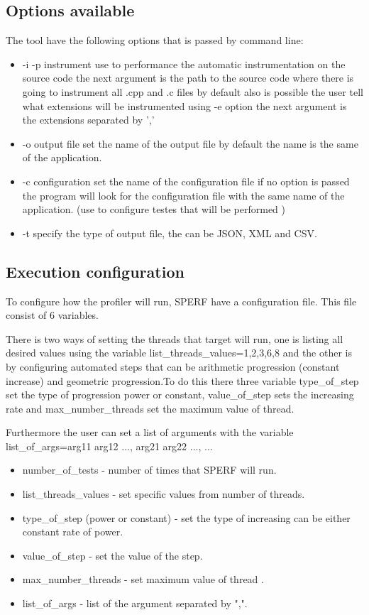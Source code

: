 \documentclass[sigconf]{acmart}
\begin{document}
\subsection{Options available}

The tool have the following options that is passed by command line:
\begin{itemize}
\item -i -p instrument use to performance the automatic instrumentation on the source code the next argument is the path to the source code where there is going to instrument all .cpp and .c files by default also is possible the user tell what extensions will be instrumented using -e option the next argument is the extensions separated by ','
\item -o output file set the name of the output file by default the name is the same of the application.
\item -c configuration set the name of the configuration file if no option is passed the program will look for the configuration file with the same name of the application. (use to configure testes that will be performed )
\item -t specify the type of output file, the can be JSON, XML and CSV.
\end{itemize}

\subsection{Execution configuration}
To configure how the profiler will run, SPERF have a configuration file. This file consist of 6 variables.

There is two ways of setting the threads that target will run, one is listing all desired values using the variable list\_threads\_values={1,2,3,6,8} and the other is by configuring automated steps that can be arithmetic progression (constant increase) and geometric progression.To do this there three variable type\_of\_step set the type of progression power or constant, value\_of\_step sets the increasing rate and max\_number\_threads set the maximum value of thread.

Furthermore the user can set a list of arguments with the variable list\_of\_args={arg11 arg12 ..., arg21 arg22 ..., ...}

\begin{itemize}
\item number\_of\_tests - number of times that SPERF will run.
\item list\_threads\_values - set specific values from number of threads.
\item type\_of\_step (power or constant) - set the type of increasing can be either constant rate of power.
\item value\_of\_step - set the value of the step.
\item max\_number\_threads - set maximum value of thread .
\item list\_of\_args - list of the argument separated by ",".
\end{itemize}
\end{document}
